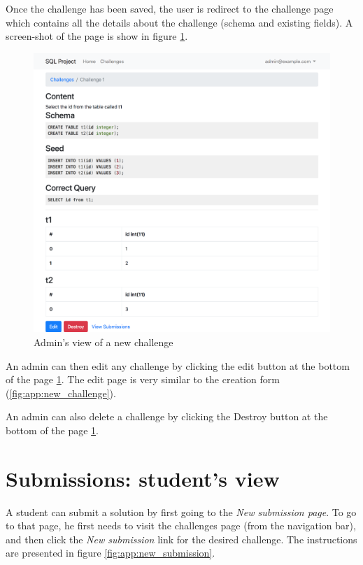 Once the challenge has been saved, the user is redirect to the challenge page which contains all the details about the challenge (schema and existing fields). A screen-shot of the page is show in figure \ref{fig:app:challengeadmin}.

\begin{figure}[ht]
    \centering
    \includegraphics[width=\textwidth/4*3]{Appendices/adminchallenge.png}
    \caption{Admin's view of a new challenge}
    \label{fig:app:challengeadmin}
\end{figure}

An admin can then edit any challenge by clicking the edit button at the bottom of the page \ref{fig:app:challengeadmin}. The edit page is very similar to the creation form (\ref{fig:app:new_challenge}).

An admin can also delete a challenge by clicking the Destroy button at the bottom of the page \ref{fig:app:challengeadmin}.

\section{Submissions: student's view}

A student can submit a solution by first going to the \textit{New submission page}. To go to that page, he first needs to visit the challenges page (from the navigation bar), and then click the \textit{New submission} link for the desired challenge. The instructions are presented in figure \ref{fig:app:new_submission}.

